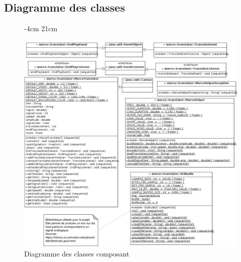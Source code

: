 \documentclass[a4paper,11pt]{article}
\begin{document}
    \subsection{Diagramme des classes}
    \begin{figure}[H]
    	 -4cm 21cm
    	\begin{center}
    		\includegraphics[scale=0.58]{classdiag.png}
    		\caption{Diagramme des classes composant}
    		\label{Diagramme des classes du composant}
    	\end{center}
    \end{figure}
\end{document}
